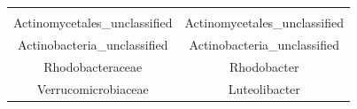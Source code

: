 \documentclass[]{article}
\begin{document}
\begin{longtable}[]{@{}cc@{}}
\begin{minipage}[t]{0.41\columnwidth}
\end{minipage}\tabularnewline
\begin{minipage}[t]{0.41\columnwidth}\centering\strut
Actinomycetales\_unclassified\strut
\end{minipage} & \begin{minipage}[t]{0.41\columnwidth}\centering\strut
Actinomycetales\_unclassified\strut
\end{minipage}\tabularnewline
\begin{minipage}[t]{0.41\columnwidth}\centering\strut
Actinobacteria\_unclassified\strut
\end{minipage} & \begin{minipage}[t]{0.41\columnwidth}\centering\strut
Actinobacteria\_unclassified\strut
\end{minipage}\tabularnewline
\begin{minipage}[t]{0.41\columnwidth}\centering\strut
Rhodobacteraceae\strut
\end{minipage} & \begin{minipage}[t]{0.41\columnwidth}\centering\strut
Rhodobacter\strut
\end{minipage}\tabularnewline
\begin{minipage}[t]{0.41\columnwidth}\centering\strut
Verrucomicrobiaceae\strut
\end{minipage} & \begin{minipage}[t]{0.41\columnwidth}\centering\strut
Luteolibacter\strut
\end{minipage}\tabularnewline
\bottomrule
\end{longtable}
\end{document}
